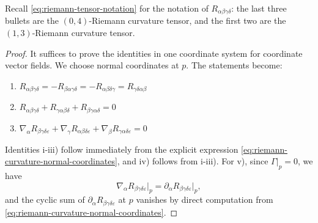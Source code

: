 Recall \eqref{eq:riemann-tensor-notation} for the notation of $R_{\alpha\beta\gamma\delta}$: the last three bullets are the $(0,4)$-Riemann curvature tensor, and the first two are the $(1,3)$-Riemann curvature tensor.

\begin{proof}
It suffices to prove the identities in one coordinate system for coordinate vector fields. We choose normal coordinates at $p$. The statements become:

\begin{enumerate}
    \item[i-iii)] $R_{\alpha\beta\gamma\delta} = -R_{\beta\alpha\gamma\delta} = -R_{\alpha\beta\delta\gamma} = R_{\gamma\delta\alpha\beta}$
    
    \item[iv)] $R_{\alpha\beta\gamma\delta} + R_{\gamma\alpha\beta\delta} + R_{\beta\gamma\alpha\delta} = 0$
    
    \item[v)] $\nabla_\alpha R_{\beta\gamma\delta\varepsilon} + \nabla_\gamma R_{\alpha\beta\delta\varepsilon} + \nabla_\beta R_{\gamma\alpha\delta\varepsilon} = 0$
\end{enumerate}

Identities i-iii) follow immediately from the explicit expression \eqref{eq:riemann-curvature-normal-coordinates}, and iv) follows from i-iii). For v), since $\Gamma|_p = 0$, we have
\[
    \nabla_\alpha R_{\beta\gamma\delta\varepsilon}\big|_p = \partial_\alpha R_{\beta\gamma\delta\varepsilon}\big|_p,
\]
and the cyclic sum of $\partial_\alpha R_{\beta\gamma\delta\varepsilon}$ at $p$ vanishes by direct computation from \eqref{eq:riemann-curvature-normal-coordinates}.
\end{proof}




